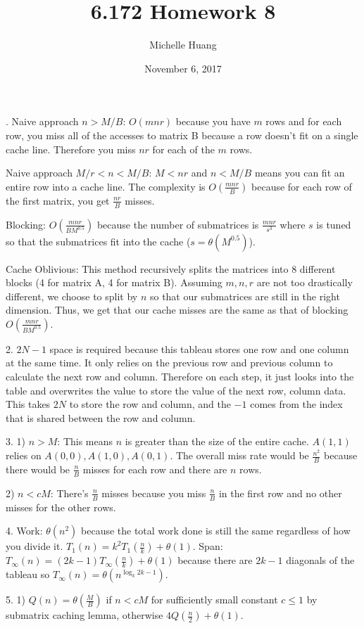 \documentclass{article}
\title{6.172 Homework 8}
\author{Michelle Huang}
\date{November 6, 2017}
\begin{document}
. Naive approach $n > M/B$: $O(mnr)$ because you have $m$ rows and for each row, you miss all of the accesses to matrix B because a row doesn't fit on a single cache line. Therefore you miss $nr$ for each of the $m$ rows.

Naive approach $M/r < n < M/B$: $M < nr$ and $n < M/B$ means you can fit an entire row into a cache line. The complexity is $O(\frac{mnr}{B})$ because for each row of the first matrix, you get $\frac{nr}{B}$ misses.

Blocking: $O(\frac{mnr}{BM^{0.5}})$ because the number of submatrices is $\frac{mnr}{s^3}$ where $s$ is tuned so that the submatrices fit into the cache ($s = \theta(M^{0.5})$).

Cache Oblivious: This method recursively splits the matrices into 8 different blocks (4 for matrix A, 4 for matrix B). Assuming $m,n,r$ are not too drastically different, we choose to split by $n$ so that our submatrices are still in the right dimension. Thus, we get that our cache misses are the same as that of blocking $O(\frac{mnr}{BM^{0.5}})$. 

2. $2N-1$ space is required because this tableau stores one row and one column at the same time. It only relies on the previous row and previous column to calculate the next row and column. Therefore on each step, it just looks into the table and overwrites the value to store the value of the next row, column data. This takes $2N$ to store the row and column, and the $-1$ comes from the index that is shared between the row and column.

3. 1) $n > M$: This means $n$ is greater than the size of the entire cache. $A(1,1)$ relies on $A(0,0), A(1,0), A(0,1)$. The overall miss rate would be $\frac{n^2}{B}$ because there would be $\frac{n}{B}$ misses for each row and there are $n$ rows. 

2) $n < cM$: There's $\frac{n}{B}$ misses because you miss $\frac{n}{B}$ in the first row and no other misses for the other rows.

4. Work: $\theta(n^2)$ because the total work done is still the same regardless of how you divide it. $T_1(n) = k^2T_1(\frac{n}{k}) + \theta(1)$.
Span: $T_\infty(n) = (2k-1)T_\infty(\frac{n}{k}) + \theta(1)$ because there are $2k-1$ diagonals of the tableau so $T_\infty(n) = \theta(n^{\log_k{2k-1}})$.

5. 1) $Q(n) = \theta(\frac{M}{B})$ if $n < cM$ for sufficiently small constant $c \leq 1$ by submatrix caching lemma, otherwise $4Q(\frac{n}{2}) + \theta(1)$.
\end{document}
